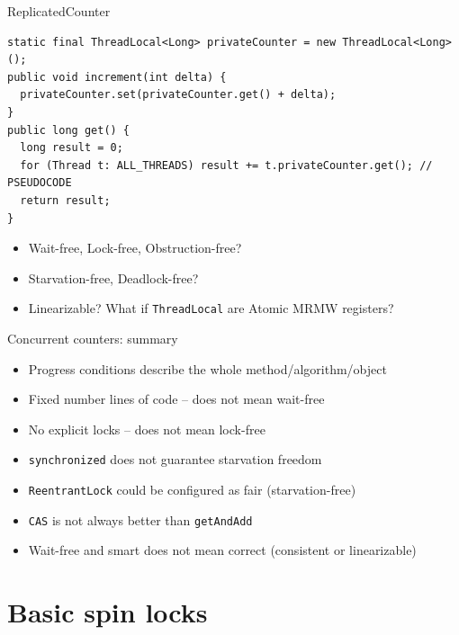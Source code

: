\begin{frame}[t,fragile]{ReplicatedCounter}

\begin{verbatim}
static final ThreadLocal<Long> privateCounter = new ThreadLocal<Long>();
public void increment(int delta) {
  privateCounter.set(privateCounter.get() + delta);   
}
public long get() { 
  long result = 0;
  for (Thread t: ALL_THREADS) result += t.privateCounter.get(); // PSEUDOCODE
  return result;
}
\end{verbatim}


\begin{itemize}  
  \item Wait-free, Lock-free, Obstruction-free?
  \item Starvation-free, Deadlock-free?
  \pause
  \item Linearizable? \pause What if \texttt{ThreadLocal} are Atomic MRMW registers?
\end{itemize}
\end{frame}


\begin{frame}[t,fragile]{Concurrent counters: summary}

\begin{itemize}  
  \item Progress conditions describe the whole method/algorithm/object
  \pause
  \item Fixed number lines of code -- does not mean wait-free
  \pause
  \item No explicit locks -- does not mean lock-free
  \pause
  \item \texttt{synchronized} does not guarantee starvation freedom
  \pause
  \item \texttt{ReentrantLock} could be configured as fair (starvation-free)
  \pause
  \item \texttt{CAS} is not always better than \texttt{getAndAdd}
  \pause
  \item Wait-free and smart does not mean correct (consistent or linearizable)
\end{itemize}

\end{frame}

\section{Basic spin locks}
\showTOC

